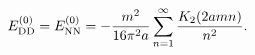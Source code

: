 \begin{equation}
\label{E0}
E_{\rm DD}^{(0)}=E_{\rm NN}^{(0)}=-\frac{m^2}{16\pi^2 a}
\sum_{n=1}^{\infty}\frac{K_2(2amn)}{n^2}.
\end{equation}

